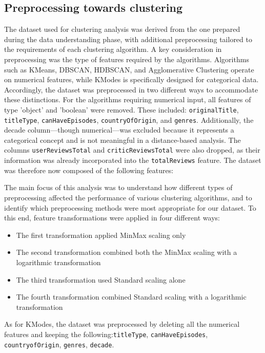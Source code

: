 \documentclass[10pt]{article}
\begin{document}
\subsection{Preprocessing towards clustering}
The dataset used for clustering analysis was derived from the one prepared during the data understanding phase, with additional preprocessing tailored to the requirements of each clustering algorithm.
A key consideration in preprocessing was the type of features required by the algorithms. Algorithms such as KMeans, DBSCAN, HDBSCAN, and Agglomerative Clustering operate on numerical features, while KModes is specifically designed for categorical data. Accordingly, the dataset was preprocessed in two different ways to accommodate these distinctions.
For the algorithms requiring numerical input, all features of type 'object' and 'boolean' were removed. These included: \texttt{originalTitle}, \texttt{titleType}, \texttt{canHaveEpisodes}, \texttt{countryOfOrigin}, and \texttt{genres}. Additionally, the decade column—though numerical—was excluded because it represents a categorical concept and is not meaningful in a distance-based analysis. The columns \texttt{userReviewsTotal} and \texttt{criticReviewsTotal} were also dropped, as their information was already incorporated into the \texttt{totalReviews} feature.
The dataset was therefore now composed of the following features: 

The main focus of this analysis was to understand how different types of preprocessing affected the performance of various clustering algorithms, and to identify which preprocessing methods were most appropriate for our dataset. To this end, feature transformations were applied in four different ways:
\begin{itemize}
	\item The first transformation applied MinMax scaling only
	\item The second transformation combined both the MinMax scaling with a logarithmic transformation
	\item The third transformation used Standard scaling alone
	\item The fourth transformation combined Standard scaling with a logarithmic transformation	
\end{itemize}

As for KModes, the dataset was preprocessed by deleting all the numerical features and keeping the following:\texttt{titleType}, \texttt{canHaveEpisodes}, \texttt{countryofOrigin}, \texttt{genres}, \texttt{decade}.
\end{document}
